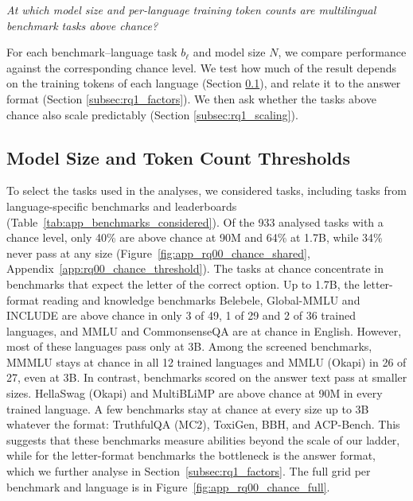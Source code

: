\begin{rquestion}
\textit{At which model size and per-language training token counts are multilingual benchmark tasks above chance?}
\end{rquestion}

For each benchmark--language task $b_\ell$ and model size $N$, we compare performance against the corresponding chance level.
We test how much of the result depends on the training tokens of each language (Section \ref{subsec:rq1_size_tokens}), and relate it to the answer format (Section \ref{subsec:rq1_factors}). We then ask whether the tasks above chance also scale predictably (Section \ref{subsec:rq1_scaling}).

\subsection{Model Size and Token Count Thresholds}
\label{subsec:rq1_size_tokens} 

To select the tasks used in the analyses, we considered \ntasksconsidered tasks, including tasks from language-specific benchmarks and leaderboards (Table~\ref{tab:app_benchmarks_considered}).
 Of the 933 analysed tasks with a chance level, only 40\% are above chance at 90M and 64\% at 1.7B, while 34\% never pass at any size (Figure~\ref{fig:app_rq00_chance_shared}, Appendix~\ref{app:rq00_chance_threshold}). 
The tasks at chance concentrate in benchmarks that expect the letter of the correct option. Up to 1.7B, the letter-format reading and knowledge benchmarks Belebele, Global-MMLU and INCLUDE are above chance in only 3 of 49, 1 of 29 and 2 of 36 trained languages, and MMLU and CommonsenseQA are at chance in English. However, most of these languages pass only at 3B. %
Among the screened benchmarks, MMMLU stays at chance in all 12 trained languages and MMLU (Okapi) in 26 of 27, even at 3B.
In contrast, benchmarks scored on the answer text pass at smaller sizes. HellaSwag (Okapi) and MultiBLiMP are above chance at 90M in every trained language. A few benchmarks stay at chance at every size up to 3B whatever the format: TruthfulQA (MC2), ToxiGen, BBH, and ACP-Bench.
This suggests that these benchmarks measure abilities beyond the scale of our ladder, while for the letter-format benchmarks the bottleneck is the answer format, which we further analyse in Section~\ref{subsec:rq1_factors}.
The full grid per benchmark and language is in Figure~\ref{fig:app_rq00_chance_full}. 


